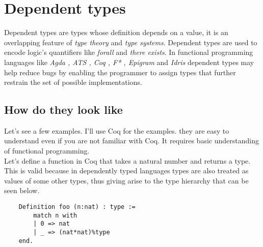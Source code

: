 \chapter{Dependent types}
     Dependent types are types whose definition depends on a value, it is an overlapping feature of \textit{type
theory} and \textit{type systems}. Dependent types are used to encode logic's quantifiers like \textit{forall}
 and \textit{there exists}. In functional programming languages like \textit{Agda , ATS , Coq , F* , Epigram}
and \textit{Idris} dependent types may help reduce bugs by enabling the programmer to assign types that 
further restrain the set of possible implementations. 

\section{How do they look like}
    Let's see a few examples. I'll use Coq for the examples. they are easy to understand even if you are
not familiar with Coq. It requires basic understanding of functional programming.\\
    Let's define a function in Coq that takes a natural number and returns a type. This is valid because 
in dependently typed languages types are also treated as values of some other types, thus giving arise to 
the type hierarchy  that can be seen below.
\begin{verbatim}
    Definition foo (n:nat) : type :=
        match n with
        | 0 => nat
        | _ => (nat*nat)%type
    end.
\end{verbatim}

